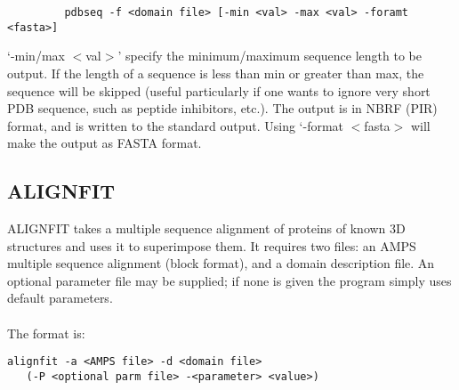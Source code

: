 \begin{scriptsize}\begin{verbatim}
         pdbseq -f <domain file> [-min <val> -max <val> -foramt <fasta>]
\end{verbatim} \end{scriptsize}

`-min/max $<$val$>$' specify the minimum/maximum sequence length
to be output.  If the length of a sequence is less than min or greater than max, the
sequence will be skipped (useful particularly if one wants to ignore very short
PDB sequence, such as peptide inhibitors, etc.).
The output is in NBRF (PIR) format, and is written to the standard
output.  Using `-format $<$fasta$>$ will make the output as FASTA
format.

\subsection{ALIGNFIT}

ALIGNFIT takes a multiple sequence alignment of proteins of known 3D structures
and uses it to superimpose them. It requires two files: an 
AMPS multiple sequence alignment (block format), and a domain 
description file.  An optional parameter file may be supplied; if 
none is given the program simply uses default parameters.\\
\\
The format is:\\

\begin{scriptsize}\begin{verbatim}
alignfit -a <AMPS file> -d <domain file> 
   (-P <optional parm file> -<parameter> <value>)
\end{verbatim} \end{scriptsize}

